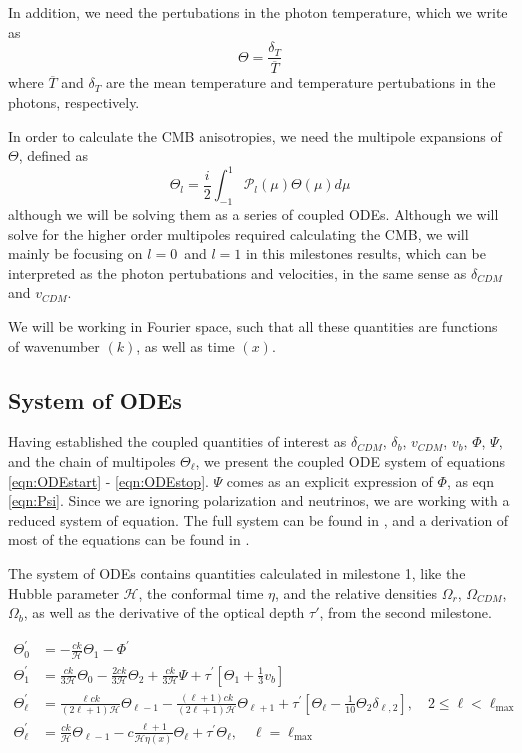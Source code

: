 \documentclass[10pt, a4paper]{article}
\renewcommand{\bar}{\overline}
\begin{document}
In addition, we need the pertubations in the photon temperature, which we write as
\begin{equation}
    \Theta = \frac{\delta_T}{\bar{T}}
\end{equation}
where $\bar{T}$ and $\delta_{T}$ are the mean temperature and temperature pertubations in the photons, respectively.

In order to calculate the CMB anisotropies, we need the multipole expansions of $\Theta$, defined as\cite{callin2006}
\begin{equation}
\Theta_{l}=\frac{i}{2} \int_{-1}^{1} \mathcal{P}_{l}(\mu) \Theta(\mu) d \mu
\end{equation}
although we will be solving them as a series of coupled ODEs. Although we will solve for the higher order multipoles required calculating the CMB, we will mainly be focusing on $l=0$ and $l=1$ in this milestones results, which can be interpreted as the photon pertubations and velocities, in the same sense as $\delta_{CDM}$ and $v_{CDM}$.

We will be working in Fourier space, such that all these quantities are functions of wavenumber $(k)$, as well as time $(x)$.


\subsection{System of ODEs}
Having established the coupled quantities of interest as $\delta_{CDM}$, $\delta_{b}$, $v_{CDM}$, $v_{b}$, $\Phi$, $\Psi$, and the chain of multipoles $\Theta_\ell$, we present the coupled ODE system of equations \ref{eqn:ODEstart} - \ref{eqn:ODEstop}. $\Psi$ comes as an explicit expression of $\Phi$, as eqn \ref{eqn:Psi}. Since we are ignoring polarization and neutrinos, we are working with a reduced system of equation. The full system can be found in \cite{callin2006}, and a derivation of most of the equations can be found in \cite{ModernCosmology2003}.

The system of ODEs contains quantities calculated in milestone 1, like the Hubble parameter $\mathcal{H}$, the conformal time $\eta$, and the relative densities $\Omega_r$, $\Omega_{CDM}$, $\Omega_b$, as well as the derivative of the optical depth $\tau'$, from the second milestone.

\begin{align}
    \label{eqn:ODEstart}
    \Theta_{0}^{\prime} &= -\frac{c k}{\mathcal{H}} \Theta_{1}-\Phi^{\prime}\\
    \Theta_{1}^{\prime} &= \frac{c k}{3 \mathcal{H}} \Theta_{0}-\frac{2 c k}{3 \mathcal{H}} \Theta_{2}+\frac{c k}{3 \mathcal{H}} \Psi+\tau^{\prime}\left[\Theta_{1}+\frac{1}{3} v_{b}\right] \\
    \Theta_{\ell}^{\prime} &= \frac{\ell c k}{(2 \ell+1) \mathcal{H}} \Theta_{\ell-1}-\frac{(\ell+1) c k}{(2 \ell+1) \mathcal{H}} \Theta_{\ell+1}+\tau^{\prime}\left[\Theta_{\ell}-\frac{1}{10} \Theta_2 \delta_{\ell, 2}\right], \quad 2 \leq \ell<\ell_{\max } \\
    \Theta_{\ell}^{\prime} &= \frac{c k}{\mathcal{H}} \Theta_{\ell-1}-c \frac{\ell+1}{\mathcal{H} \eta(x)} \Theta_{\ell}+\tau^{\prime} \Theta_{\ell}, \quad \ell=\ell_{\max }
\end{align}
\end{document}
